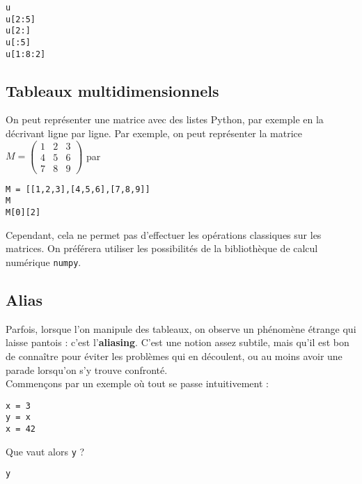 \begin{lstlisting}
u
u[2:5]
u[2:]
u[:5]
u[1:8:2]
\end{lstlisting}

\subsection{Tableaux multidimensionnels}

On peut représenter une matrice avec des listes Python, par exemple en la décrivant ligne par 
ligne. 
Par exemple, on peut représenter la matrice 
$
  M=\begin{pmatrix}
    1&2&3 \\ 4&5&6 \\ 7&8&9
  \end{pmatrix}
$
par
\begin{lstlisting}
M = [[1,2,3],[4,5,6],[7,8,9]]
M
M[0][2]
\end{lstlisting}
Cependant, cela ne permet pas d'effectuer les opérations classiques sur les matrices. On préférera 
utiliser les possibilités de la bibliothèque de calcul numérique \texttt{numpy}.

\subsection{Alias}

Parfois, lorsque l'on manipule des tableaux, on observe un phénomène étrange qui laisse pantois : 
c'est l'\textbf{aliasing}. C'est une notion assez subtile, mais qu'il est bon de connaître pour 
éviter les problèmes qui en découlent, ou au moins avoir une parade lorsqu'on s'y trouve 
confronté.\\


Commençons par un exemple où tout se passe intuitivement :
\begin{lstlisting}
x = 3
y = x
x = 42
\end{lstlisting}

Que vaut alors \texttt{y} ? 
\begin{lstlisting}
y
\end{lstlisting}

